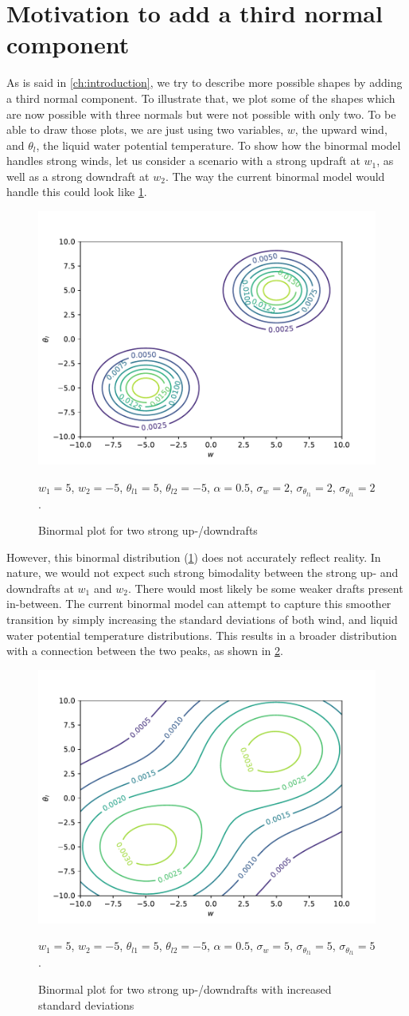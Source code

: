 \section{Motivation to add a third normal component}\label{sec:motivation}

As is said in \cref{ch:introduction},
we try to describe more possible shapes by adding a third normal component.
To illustrate that, we plot some of the shapes which are now possible with three normals
but were not possible with only two.
To be able to draw those plots, we are just using two variables, $w$, the upward wind,
and $\theta_l$, the liquid water potential temperature.
To show how the binormal model handles strong winds,
let us consider a scenario with a strong updraft at $w_1$, as well as a strong downdraft at $w_2$.
The way the current binormal model would handle this could look like \cref{fig:plot1}.
\begin{figure}[!htb]
    \centering
    \includegraphics[width=.48\textwidth]{include/figures/plot1}
    \caption{Binormal plot for two strong up-/downdrafts}
    \label{fig:plot1}
    $w_1 = 5$, $w_2 = -5$, $\theta_{l1} = 5$, $\theta_{l2} = -5$,
    $\alpha = 0.5$, $\sigma_w = 2$, $\sigma_{\theta_{l1}} = 2$, $\sigma_{\theta_{l1}} = 2$.
\end{figure}
However, this binormal distribution (\cref{fig:plot1}) does not accurately reflect reality.
In nature, we would not expect such strong bimodality between the strong up-
and downdrafts at $w_1$ and $w_2$.
There would most likely be some weaker drafts present in-between.
The current binormal model can attempt to capture this smoother transition
by simply increasing the standard deviations of both wind,
and liquid water potential temperature distributions.
This results in a broader distribution with a connection between the two peaks,
as shown in \cref{fig:plot2}.
\begin{figure}[!htb]
    \centering
    \includegraphics[width=.5\textwidth]{include/figures/plot2}
    \caption{Binormal plot for two strong up-/downdrafts with increased standard deviations}
    \label{fig:plot2}
    $w_1 = 5$, $w_2 = -5$, $\theta_{l1} = 5$, $\theta_{l2} = -5$,
    $\alpha = 0.5$, $\sigma_w = 5$, $\sigma_{\theta_{l1}} = 5$, $\sigma_{\theta_{l1}} = 5$.
\end{figure}
